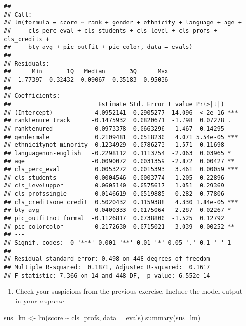 \documentclass[
]{article}
\newenvironment{Shaded}{\begin{snugshade}}{\end{snugshade}}
\newcommand{\AttributeTok}[1]{\textcolor[rgb]{0.77,0.63,0.00}{#1}}
\newcommand{\FunctionTok}[1]{\textcolor[rgb]{0.00,0.00,0.00}{#1}}
\newcommand{\NormalTok}[1]{#1}
\newcommand{\OtherTok}[1]{\textcolor[rgb]{0.56,0.35,0.01}{#1}}
\newcommand{\SpecialCharTok}[1]{\textcolor[rgb]{0.00,0.00,0.00}{#1}}
\providecommand{\tightlist}{%
  \setlength{\itemsep}{0pt}\setlength{\parskip}{0pt}}
\begin{document}
\begin{verbatim}
## 
## Call:
## lm(formula = score ~ rank + gender + ethnicity + language + age + 
##     cls_perc_eval + cls_students + cls_level + cls_profs + cls_credits + 
##     bty_avg + pic_outfit + pic_color, data = evals)
## 
## Residuals:
##      Min       1Q   Median       3Q      Max 
## -1.77397 -0.32432  0.09067  0.35183  0.95036 
## 
## Coefficients:
##                         Estimate Std. Error t value Pr(>|t|)    
## (Intercept)            4.0952141  0.2905277  14.096  < 2e-16 ***
## ranktenure track      -0.1475932  0.0820671  -1.798  0.07278 .  
## ranktenured           -0.0973378  0.0663296  -1.467  0.14295    
## gendermale             0.2109481  0.0518230   4.071 5.54e-05 ***
## ethnicitynot minority  0.1234929  0.0786273   1.571  0.11698    
## languagenon-english   -0.2298112  0.1113754  -2.063  0.03965 *  
## age                   -0.0090072  0.0031359  -2.872  0.00427 ** 
## cls_perc_eval          0.0053272  0.0015393   3.461  0.00059 ***
## cls_students           0.0004546  0.0003774   1.205  0.22896    
## cls_levelupper         0.0605140  0.0575617   1.051  0.29369    
## cls_profssingle       -0.0146619  0.0519885  -0.282  0.77806    
## cls_creditsone credit  0.5020432  0.1159388   4.330 1.84e-05 ***
## bty_avg                0.0400333  0.0175064   2.287  0.02267 *  
## pic_outfitnot formal  -0.1126817  0.0738800  -1.525  0.12792    
## pic_colorcolor        -0.2172630  0.0715021  -3.039  0.00252 ** 
## ---
## Signif. codes:  0 '***' 0.001 '**' 0.01 '*' 0.05 '.' 0.1 ' ' 1
## 
## Residual standard error: 0.498 on 448 degrees of freedom
## Multiple R-squared:  0.1871, Adjusted R-squared:  0.1617 
## F-statistic: 7.366 on 14 and 448 DF,  p-value: 6.552e-14
\end{verbatim}

\begin{enumerate}
\def\labelenumi{\arabic{enumi}.}
\setcounter{enumi}{11}
\tightlist
\item
  Check your suspicions from the previous exercise. Include the model
  output in your response.
\end{enumerate}

\begin{Shaded}
\begin{Highlighting}[]
\NormalTok{sus\_lm }\OtherTok{\textless{}{-}} \FunctionTok{lm}\NormalTok{(score }\SpecialCharTok{\textasciitilde{}}\NormalTok{ cls\_profs, }\AttributeTok{data =}\NormalTok{ evals)}
\FunctionTok{summary}\NormalTok{(sus\_lm)}
\end{Highlighting}
\end{Shaded}
\end{document}
